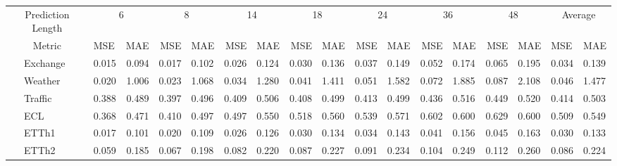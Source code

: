 \begin{table*}[t]
\centering
\small
\setlength{\tabcolsep}{0.6mm}
\begin{tabular}{ll|lr|rl|rl|rl|rl|rl|rl|ll|}
\hline
\multicolumn{2}{c|}{Prediction Length} & \multicolumn{2}{c|}{6} & \multicolumn{2}{c|}{8} & \multicolumn{2}{c|}{14} & \multicolumn{2}{c|}{18} & \multicolumn{2}{c|}{24} & \multicolumn{2}{c|}{36} & \multicolumn{2}{c|}{48} & \multicolumn{2}{c|}{Average} \\ \cline{3-18} 
\multicolumn{2}{c|}{Metric} & MSE & MAE & MSE & MAE & MSE & MAE & MSE & MAE & MSE & MAE & MSE & MAE & MSE & MAE & MSE & MAE \\ \hline
{\multirow{6}{*}{\rotatebox[origin=c]{90}{TimePFN-96 }}} & Exchange & 0.015 & 0.094 & 0.017 & 0.102 & 0.026 & 0.124 & 0.030 & 0.136 & 0.037 & 0.149 & 0.052 & 0.174 & 0.065 & 0.195 & 0.034 & 0.139 \\
 & Weather & 0.020 & 1.006 & 0.023 & 1.068 & 0.034 & 1.280 & 0.041 & 1.411 & 0.051 & 1.582 & 0.072 & 1.885 & 0.087 & 2.108 & 0.046 & 1.477 \\
 & Traffic & 0.388 & 0.489 & 0.397 & 0.496 & 0.409 & 0.506 & 0.408 & 0.499 & 0.413 & 0.499 & 0.436 & 0.516 & 0.449 & 0.520 & 0.414 & 0.503 \\
 & ECL & 0.368 & 0.471 & 0.410 & 0.497 & 0.497 & 0.550 & 0.518 & 0.560 & 0.539 & 0.571 & 0.602 & 0.600 & 0.629 & 0.600 & 0.509 & 0.549 \\
 & ETTh1 & 0.017 & 0.101 & 0.020 & 0.109 & 0.026 & 0.126 & 0.030 & 0.134 & 0.034 & 0.143 & 0.041 & 0.156 & 0.045 & 0.163 & 0.030 & 0.133 \\
 & ETTh2 & 0.059 & 0.185 & 0.067 & 0.198 & 0.082 & 0.220 & 0.087 & 0.227 & 0.091 & 0.234 & 0.104 & 0.249 & 0.112 & 0.260 & 0.086 & 0.224 \\ \hline




\end{tabular}
\end{table*}
